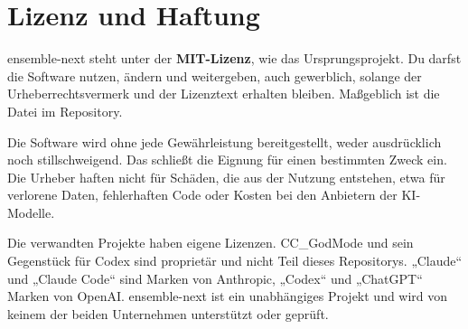 \documentclass[a4paper,10pt,parskip=half-,headings=small]{scrartcl}
\newcommand{\code}[1]{\texttt{\detokenize{#1}}}
\begin{document}
\section{Lizenz und Haftung}\label{sec:lizenz}

ensemble-next steht unter der \textbf{MIT-Lizenz}, wie das Ursprungsprojekt. Du darfst die Software
nutzen, ändern und weitergeben, auch gewerblich, solange der Urheberrechtsvermerk und der Lizenztext
erhalten bleiben. Maßgeblich ist die Datei \code{LICENSE} im Repository.

\begin{hinweis}
Die Software wird ohne jede Gewährleistung bereitgestellt, weder ausdrücklich noch stillschweigend.
Das schließt die Eignung für einen bestimmten Zweck ein. Die Urheber haften nicht für Schäden, die
aus der Nutzung entstehen, etwa für verlorene Daten, fehlerhaften Code oder Kosten bei den Anbietern
der KI-Modelle.
\end{hinweis}

Die verwandten Projekte haben eigene Lizenzen. CC\_GodMode und sein Gegenstück für Codex sind
proprietär und nicht Teil dieses Repositorys. „Claude“ und „Claude Code“ sind Marken von Anthropic,
„Codex“ und „ChatGPT“ Marken von OpenAI. ensemble-next ist ein unabhängiges Projekt und wird von
keinem der beiden Unternehmen unterstützt oder geprüft.
\end{document}
